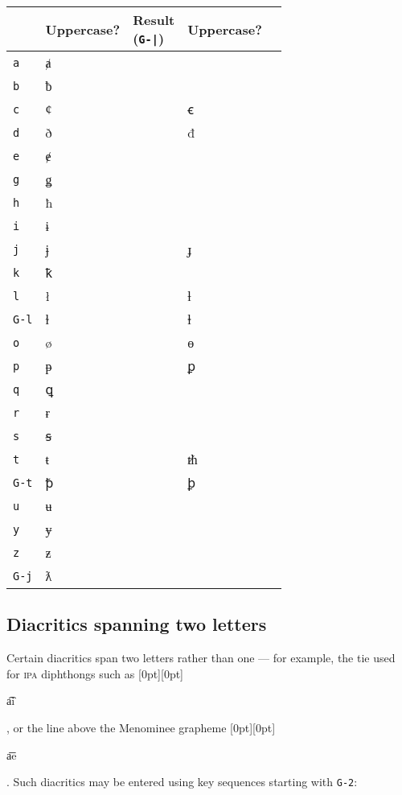 \documentclass[oneside]{memoir}
\newcommand{\cmark}{\ding{51}}
\newcommand{\xmark}{\ding{55}}
\newcommand{\key}{\verb}
\newcommand{\keynv}{\texttt}
\newcommand{\out}[1]{\raisebox{0pt}[0pt][0pt]{\setlength{\fboxsep}{1pt}\colorbox{gray!20}{\strut{}#1}}}
\begin{document}
{\begin{table}[!b]
\begin{minipage}{0.55\paperwidth}
\begin{tabular}{lllll}
 & Uppercase?
 & \makecell{Result\\(\keynv{G-|})}
 & Uppercase? \\
\midrule
\key|a|   & ⱥ & \cmark &   & \\
\key|b|   & ƀ & \cmark &   & \\
\key|c|   & ȼ & \cmark & ꞓ & \cmark \\
\key|d|   & ð & \cmark & đ & \cmark \\
\key|e|   & ɇ & \cmark &   & \\
\key|g|   & ǥ & \cmark &   & \\
\key|h|   & ħ & \cmark &   & \\
\key|i|   & ɨ & \cmark &   & \\
\key|j|   & ɉ & \cmark & ɟ & \xmark \\
\key|k|   & ꝁ & \cmark &   & \\
\key|l|   & ł & \cmark & ƚ & \cmark \\
\key|G-l| & ɫ & \cmark & ⱡ & \cmark \\
\key|o|   & ø & \cmark & ɵ & \cmark \\
\key|p|   & ᵽ & \cmark & ꝑ & \cmark \\
\key|q|   & ꝗ & \cmark &   & \\
\key|r|   & ɍ & \cmark &   & \\
\key|s|   & ꞩ & \cmark &   & \\
\key|t|   & ŧ & \cmark & ᵺ & \xmark \\
\key|G-t| & ꝥ & \cmark & ꝧ & \cmark \\
\key|u|   & ʉ & \cmark &   & \\
\key|y|   & ɏ & \cmark &   & \\
\key|z|   & ƶ & \cmark &   & \\
\key|G-j| & ƛ & \xmark &   & \\
\bottomrule
\end{tabular}
\end{minipage}
\end{table}

\subsection{Diacritics spanning two letters}
\label{sec:diacritics_spanning_two_letters}

Certain diacritics span two letters rather than one --- for example, the tie used for \textsc{ipa} diphthongs such as \out{a͡i}, or the line above the Menominee grapheme \out{a͞e}.
Such diacritics may be entered using key sequences starting with \key|G-2|:

}
\end{document}
